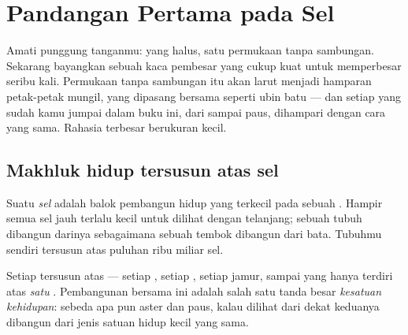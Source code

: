 \chapter{Pandangan Pertama pada Sel}\label{ch:g5:first-look-at-cells}

Amati punggung tanganmu:  yang halus, satu permukaan tanpa
sambungan. Sekarang bayangkan sebuah kaca pembesar yang cukup kuat
untuk memperbesar seribu kali. Permukaan tanpa sambungan itu akan
larut menjadi hamparan petak-petak mungil, yang dipasang bersama
seperti ubin batu --- dan setiap  yang sudah kamu jumpai
dalam buku ini, dari  sampai paus, dihampari dengan cara yang
sama. Rahasia terbesar  berukuran kecil.

\section{Makhluk hidup tersusun atas sel}

\begin{definition}[Sel]\label{def:g5:first-look-at-cells:cell}
Suatu \emph{sel} adalah balok pembangun hidup yang terkecil
pada sebuah . Hampir semua sel jauh terlalu kecil untuk
dilihat dengan  telanjang; sebuah tubuh dibangun darinya
sebagaimana sebuah tembok dibangun dari bata. Tubuhmu sendiri tersusun
atas puluhan ribu miliar sel.
\end{definition}

\begin{proposition}\label{prop:g5:first-look-at-cells:principle}
Setiap  tersusun atas  --- setiap , setiap
, setiap jamur, sampai  yang hanya terdiri atas
\emph{satu} . Pembangunan bersama ini adalah salah satu tanda besar
\emph{kesatuan kehidupan}: sebeda apa pun
 aster dan paus, kalau dilihat dari dekat keduanya dibangun dari
jenis satuan hidup kecil yang sama.
\end{proposition}
\admitted

